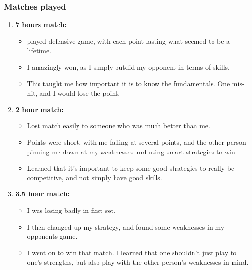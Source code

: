 \begin{frame}
\frametitle{Matches played} 
\begin{enumerate}
\item \small \textbf{7 hours match:}
\begin{itemize}
\item \tiny played defensive game, with each point lasting what seemed to be a lifetime. 
\item \tiny I amazingly won, as I simply outdid my opponent in terms of skills.
\item \tiny This taught me how important it is to know the fundamentals. One mis-hit, and I would lose the point. 
\end{itemize} 

\item \small \textbf{2 hour match:}
\begin{itemize}
\item \tiny Lost match easily to someone who was much better than me. 
\item \tiny Points were short, with me failing at several points, and the other person pinning me down at my weaknesses and using smart strategies to win.  
\item \tiny Learned that it's important to keep some good strategies to really be competitive, and not simply have good skills. 
\end{itemize}
\item \small \textbf{3.5 hour match:}
\begin{itemize} 
\item \tiny I was losing badly in first set. 
\item \tiny I then changed up my strategy,  and found some weaknesses in my opponents game. 
\item \tiny I went on to win that match.  I learned that one shouldn't just play to one's strengths, but also play with the other person's weaknesses in mind. 
\end{itemize}
\end{enumerate}
\end{frame}

